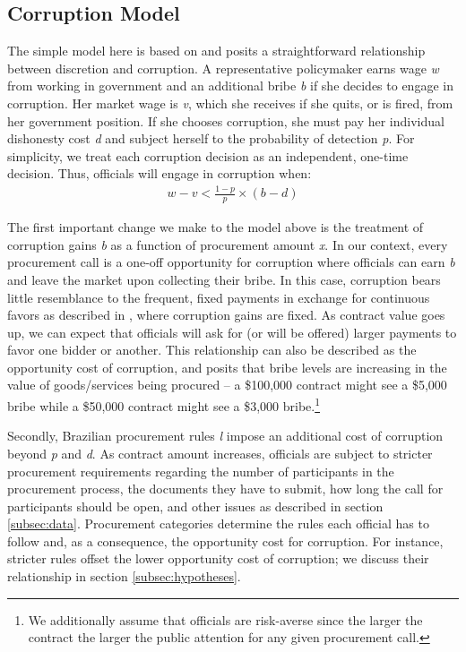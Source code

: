 \documentclass[11pt]{article}
\begin{document}
\subsection{Corruption Model} \label{subsec:corruption}

The simple model here is based on \citet{OlkenCorruptionDevelopingCountries2012b} and posits a straightforward relationship between discretion and corruption. A representative policymaker earns wage \emph{w} from working in government and an additional bribe \emph{b} if she decides to engage in corruption. Her market wage is \emph{v}, which she receives if she quits, or is fired, from her government position. If she chooses corruption, she must pay her individual dishonesty cost \emph{d} and subject herself to the probability of detection \emph{p}. For simplicity, we treat each corruption decision as an independent, one-time decision. Thus, officials will engage in corruption when:
\begin{equation} \label{eq:simplemodel}
  \begin{split}
    w - v < \frac{1-p}{p}\times(b-d)
  \end{split}
\end{equation}

The first important change we make to the model above is the treatment of corruption gains \emph{b} as a function of procurement amount \emph{x}. In our context, every procurement call is a one-off opportunity for corruption where officials can earn \emph{b} and leave the market upon collecting their bribe. In this case, corruption bears little resemblance to the frequent, fixed payments in exchange for continuous favors as described in \citet{OlkenCorruptionDevelopingCountries2012b}, where corruption gains are fixed. As contract value goes up, we can expect that officials will ask for (or will be offered) larger payments to favor one bidder or another. This relationship can also be described as the opportunity cost of corruption, and posits that bribe levels are increasing in the value of goods/services being procured -- a \$100,000 contract might see a \$5,000 bribe while a \$50,000 contract might see a \$3,000 bribe.\footnote{We additionally assume that officials are risk-averse since the larger the contract the larger the public attention for any given procurement call.}

Secondly, Brazilian procurement rules \emph{l} impose an additional cost of corruption beyond \emph{p} and \emph{d}. As contract amount increases, officials are subject to stricter procurement requirements regarding the number of participants in the procurement process, the documents they have to submit, how long the call for participants should be open, and other issues as described in section \ref{subsec:data}. Procurement categories determine the rules each official has to follow and, as a consequence, the opportunity cost for corruption. For instance, stricter rules offset the lower opportunity cost of corruption; we discuss their relationship in section \ref{subsec:hypotheses}.
\end{document}
